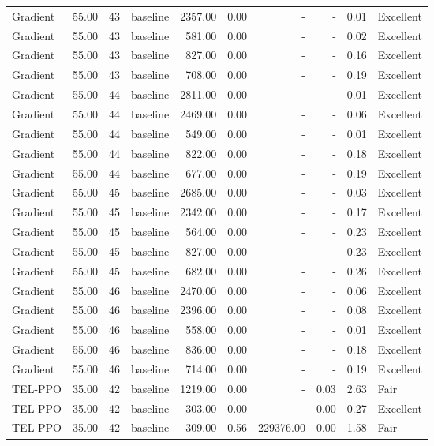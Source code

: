 \begin{table}[htbp]
\begin{tabular}{lrrlrrrrrl}
Gradient & 55.00 & 43 & baseline & 2357.00 & 0.00 & - & - & 0.01 & Excellent \\
Gradient & 55.00 & 43 & baseline & 581.00 & 0.00 & - & - & 0.02 & Excellent \\
Gradient & 55.00 & 43 & baseline & 827.00 & 0.00 & - & - & 0.16 & Excellent \\
Gradient & 55.00 & 43 & baseline & 708.00 & 0.00 & - & - & 0.19 & Excellent \\
Gradient & 55.00 & 44 & baseline & 2811.00 & 0.00 & - & - & 0.01 & Excellent \\
Gradient & 55.00 & 44 & baseline & 2469.00 & 0.00 & - & - & 0.06 & Excellent \\
Gradient & 55.00 & 44 & baseline & 549.00 & 0.00 & - & - & 0.01 & Excellent \\
Gradient & 55.00 & 44 & baseline & 822.00 & 0.00 & - & - & 0.18 & Excellent \\
Gradient & 55.00 & 44 & baseline & 677.00 & 0.00 & - & - & 0.19 & Excellent \\
Gradient & 55.00 & 45 & baseline & 2685.00 & 0.00 & - & - & 0.03 & Excellent \\
Gradient & 55.00 & 45 & baseline & 2342.00 & 0.00 & - & - & 0.17 & Excellent \\
Gradient & 55.00 & 45 & baseline & 564.00 & 0.00 & - & - & 0.23 & Excellent \\
Gradient & 55.00 & 45 & baseline & 827.00 & 0.00 & - & - & 0.23 & Excellent \\
Gradient & 55.00 & 45 & baseline & 682.00 & 0.00 & - & - & 0.26 & Excellent \\
Gradient & 55.00 & 46 & baseline & 2470.00 & 0.00 & - & - & 0.06 & Excellent \\
Gradient & 55.00 & 46 & baseline & 2396.00 & 0.00 & - & - & 0.08 & Excellent \\
Gradient & 55.00 & 46 & baseline & 558.00 & 0.00 & - & - & 0.01 & Excellent \\
Gradient & 55.00 & 46 & baseline & 836.00 & 0.00 & - & - & 0.18 & Excellent \\
Gradient & 55.00 & 46 & baseline & 714.00 & 0.00 & - & - & 0.19 & Excellent \\
TEL-PPO & 35.00 & 42 & baseline & 1219.00 & 0.00 & - & 0.03 & 2.63 & Fair \\
TEL-PPO & 35.00 & 42 & baseline & 303.00 & 0.00 & - & 0.00 & 0.27 & Excellent \\
TEL-PPO & 35.00 & 42 & baseline & 309.00 & 0.56 & 229376.00 & 0.00 & 1.58 & Fair \\

\end{tabular}
\end{table}
